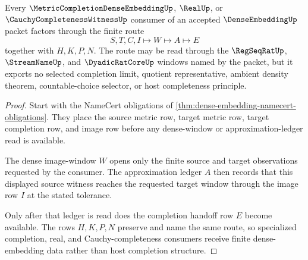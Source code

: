 \begin{theorem}\label{thm:dense-embedding-completion-handoff}
Every $\MetricCompletionDenseEmbeddingUp$, $\RealUp$, or $\CauchyCompletenessWitnessUp$ consumer of an accepted $\DenseEmbeddingUp$ packet factors through the finite route
$$
S,T,C,I\longmapsto W\longmapsto A\longmapsto E
$$
together with $H,K,P,N$. The route may be read through the $\RegSeqRatUp$, $\StreamNameUp$, and $\DyadicRatCoreUp$ windows named by the packet, but it exports no selected completion limit, quotient representative, ambient density theorem, countable-choice selector, or host completeness principle.
\end{theorem}
\begin{proof}
Start with the NameCert obligations of \autoref{thm:dense-embedding-namecert-obligations}. They place the source metric row, target metric row, target completion row, and image row before any dense-window or approximation-ledger read is available.

The dense image-window $W$ opens only the finite source and target observations requested by the consumer. The approximation ledger $A$ then records that this displayed source witness reaches the requested target window through the image row $I$ at the stated tolerance.

Only after that ledger is read does the completion handoff row $E$ become available. The rows $H,K,P,N$ preserve and name the same route, so specialized completion, real, and Cauchy-completeness consumers receive finite dense-embedding data rather than host completion structure.
\end{proof}




